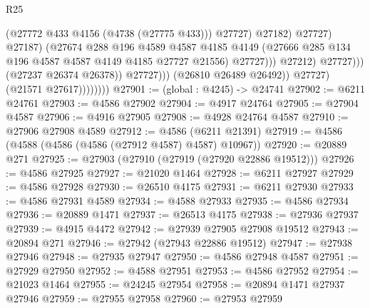 \begin{lexlean}{R25}
\begin{coremodule}
                                                  (@27772 @433 @4156 (@4738 (@27775 @433)))
                                                  @27727)
                                                @27182)
                                              @27727)
                                            @27187)
                                          (@27674
                                            @288
                                            @196
                                            @4589
                                            @4587
                                            @4185
                                            @4149
                                            (@27666
                                              @285
                                              @134
                                              @196
                                              @4587
                                              @4587
                                              @4149
                                              @4185
                                              @27727
                                              @21556)
                                            @27727)))
                                      @27212)
                                    @27727)))
                              (@27237 @26374 @26378))
                            @27727)))
                      (@26810 @26489 @26492))
                    @27727)
                  (@21571 @27617))))))))
@27901 := (global : @4245) -> @24741
@27902 := @6211 @24761
@27903 := @4586 @27902
@27904 := @4917 @24764
@27905 := @27904 @4587
@27906 := @4916 @27905
@27908 := @4928 @24764 @4587
@27910 := @27906 @27908 @4589
@27912 := @4586 (@6211 @21391)
@27919 := @4586 (@4588 (@4586 (@4586 (@27912 @4587) @4587) @10967))
@27920 := @20889 @271
@27925 := @27903 (@27910 (@27919 (@27920 @22886 @19512)))
@27926 := @4586 @27925
@27927 := @21020 @1464
@27928 := @6211 @27927
@27929 := @4586 @27928
@27930 := @26510 @4175
@27931 := @6211 @27930
@27933 := @4586 @27931 @4589
@27934 := @4588 @27933
@27935 := @4586 @27934
@27936 := @20889 @1471
@27937 := @26513 @4175
@27938 := @27936 @27937
@27939 := @4915 @4472
@27942 := @27939 @27905 @27908 @19512
@27943 := @20894 @271
@27946 := @27942 (@27943 @22886 @19512)
@27947 := @27938 @27946
@27948 := @27935 @27947
@27950 := @4586 @27948 @4587
@27951 := @27929 @27950
@27952 := @4588 @27951
@27953 := @4586 @27952
@27954 := @21023 @1464
@27955 := @24245 @27954
@27958 := @20894 @1471 @27937 @27946
@27959 := @27955 @27958
@27960 := @27953 @27959

\end{coremodule}
\end{lexlean}
